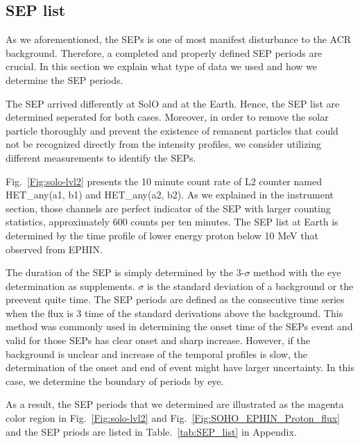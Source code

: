 \subsection{\ac{SEP} list}

As we aforementioned, the \acp{SEP} is one of most manifest disturbance to the \ac{ACR} background. Therefore, a completed and properly defined \ac{SEP} periods are crucial. In this section we explain what type of data we used and how we determine the \ac{SEP} periods.

The \ac{SEP} arrived differently at \ac{SolO} and at the Earth. Hence, the \ac{SEP} list are determined seperated for both cases.
Moreover, in order to remove the solar particle thoroughly and prevent the existence of remanent particles that could not be recognized directly from the intensity profiles, we consider utilizing different measurements to identify the \acp{SEP}.

Fig.~\ref{Fig:solo-lvl2} presents the 10 minute count rate of L2 counter named HET_any(a1, b1) and HET_any(a2, b2). As we explained in the instrument section, those channels are perfect indicator of the \ac{SEP} with larger counting statistics, approximately 600 counts per ten minutes. The \ac{SEP} list at Earth is determined by the time profile of lower energy proton below 10 MeV that observed from \ac{EPHIN}.

The duration of the SEP is simply determined by the 3-$\sigma$ method with the eye determination as supplements. $\sigma$ is the standard deviation of a background or the preevent quite time. The \ac{SEP} periods are defined as the consecutive time series when the flux is 3 time of the standard derivations above the background. This method was commonly used in determining the onset time of the SEPs event and valid for those SEPs has clear onset and sharp increase. 
However, if the background is unclear and increase of the temporal profiles is slow, the determination of the onset and end of event might have larger uncertainty. In this case, we determine the boundary of periods by eye.

As a result, the \ac{SEP} periods that we determined are illustrated as the magenta color region in Fig.~\ref{Fig:solo-lvl2} and Fig.~\ref{Fig:SOHO_EPHIN_Proton_flux} and  the \ac{SEP} priods are listed in Table.~\ref{tab:SEP_list} in Appendix.



